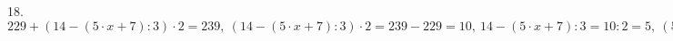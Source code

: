 18. $229+(14-(5\cdot x+7):3)\cdot2=239,\ (14-(5\cdot x+7):3)\cdot2=239-229=10,\ 14-(5\cdot x+7):3=10:2=5,\ (5\cdot x+7):3=14-5=9,\ 5\cdot x+7=9\cdot3=27,\
5\cdot x=27-7=20,\ x=20:5=4.$\\
